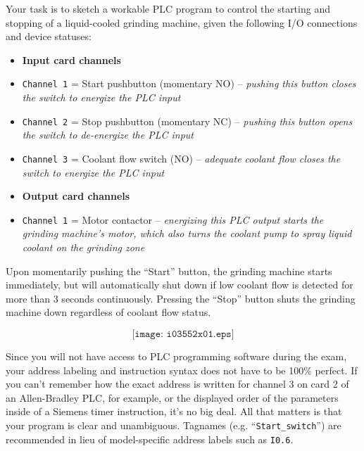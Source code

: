 

Your task is to sketch a workable PLC program to control the starting and stopping of a liquid-cooled grinding machine, given the following I/O connections and device statuses:

\begin{itemize}
\item{} {\bf Input card channels} 
\item{} {\tt Channel 1} = Start pushbutton (momentary NO) -- {\it pushing this button closes the switch to energize the PLC input}
\item{} {\tt Channel 2} = Stop pushbutton (momentary NC) -- {\it pushing this button opens the switch to de-energize the PLC input}
\item{} {\tt Channel 3} = Coolant flow switch (NO) -- {\it adequate coolant flow closes the switch to energize the PLC input}
\end{itemize}

\begin{itemize}
\item{} {\bf Output card channels} 
\item{} {\tt Channel 1} = Motor contactor -- {\it energizing this PLC output starts the grinding machine's motor, which also turns the coolant pump to spray liquid coolant on the grinding zone}
\end{itemize}

\vskip 10pt

Upon momentarily pushing the ``Start'' button, the grinding machine starts immediately, but will automatically shut down if low coolant flow is detected for more than 3 seconds continuously.  Pressing the ``Stop'' button shuts the grinding machine down regardless of coolant flow status.

$$\texttt{[image: i03552x01.eps]}$$

Since you will not have access to PLC programming software during the exam, your address labeling and instruction syntax does not have to be 100\% perfect.  If you can't remember how the exact address is written for channel 3 on card 2 of an Allen-Bradley PLC, for example, or the displayed order of the parameters inside of a Siemens timer instruction, it's no big deal.  All that matters is that your program is clear and unambiguous.  Tagnames (e.g. ``{\tt Start\_switch}'') are recommended in lieu of model-specific address labels such as {\tt I0.6}.

